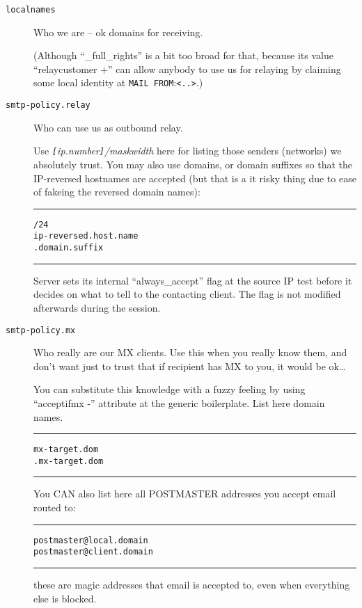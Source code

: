 \begin{description}
\item[\tt localnames] \mbox{}

Who we are -- ok domains for receiving.

(Although ``\_full\_rights'' is a bit too broad for that, because
 its value ``relaycustomer +'' can allow anybody to use us for relaying
 by claiming some local identity at {\tt MAIL FROM}:\verb/<..>/.)


\item[\tt smtp-policy.relay] \mbox{}

Who can use us as outbound relay.

Use  {\em\verb/[/ip.number\verb/]//maskwidth}  here for
listing those senders (networks) we absolutely trust.
You may also use domains, or domain suffixes so that the IP-reversed
hostnames are accepted (but that is a it risky thing due to ease of
fakeing the reversed domain names):

\begin{alltt}\medskip\hrule\medskip
  [11.22.33.00]/24
  ip-reversed.host.name
  .domain.suffix
\medskip\hrule\end{alltt}\medskip

Server sets its internal ``always\_accept'' flag at the source IP test
before it decides on what to tell to the contacting client.
The flag is not modified afterwards during the session.


\item[\tt smtp-policy.mx] \mbox{}

Who really are our MX clients.
Use this when you really know them, and don't want just to trust
that if recipient has MX to you, it would be ok\ldots

You can substitute this knowledge with a fuzzy feeling by using
``acceptifmx -'' attribute at the generic boilerplate.
List here domain names. 
\begin{alltt}\medskip\hrule\medskip
 mx-target.dom
 .mx-target.dom
\medskip\hrule\end{alltt}\medskip

You CAN also list here all POSTMASTER addresses you accept email routed to: 

\begin{alltt}\medskip\hrule\medskip
 postmaster@local.domain
 postmaster@client.domain
\medskip\hrule\end{alltt}\medskip

these are magic addresses that email is accepted to, even when everything
else is blocked. 


\end{description}
